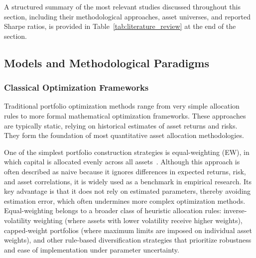 A structured summary of the most relevant studies discussed throughout this section, including their methodological approaches, asset universes, and reported Sharpe ratios, is provided in Table~\ref{tab:literature_review} at the end of the section.

\subsection{Models and Methodological Paradigms}

\subsubsection{Classical Optimization Frameworks}

Traditional portfolio optimization methods range from very simple allocation rules to more formal mathematical optimization frameworks. These approaches are typically static, relying on historical estimates of asset returns and risks. They form the foundation of most quantitative asset allocation methodologies.

One of the simplest portfolio construction strategies is equal-weighting (EW), in which capital is allocated evenly across all assets~\cite{a2240}. Although this approach is often described as naive because it ignores differences in expected returns, risk, and asset correlations, it is widely used as a benchmark in empirical research. Its key advantage is that it does not rely on estimated parameters, thereby avoiding estimation error, which often undermines more complex optimization methods. Equal-weighting belongs to a broader class of heuristic allocation rules: inverse-volatility weighting (where assets with lower volatility receive higher weights), capped-weight portfolios (where maximum limits are imposed on individual asset weights), and other rule-based diversification strategies that prioritize robustness and ease of implementation under parameter uncertainty.


